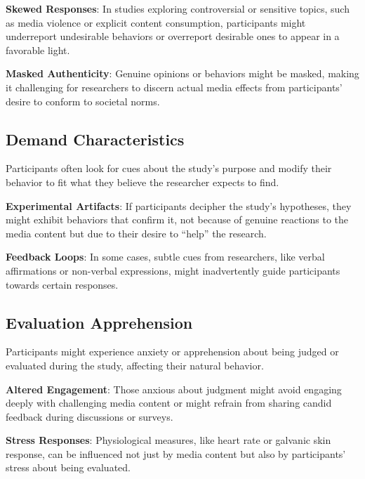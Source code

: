\documentclass[
  b5paper]{book}
\begin{document}
\textbf{Skewed Responses}: In studies exploring controversial or sensitive topics, such as media violence or explicit content consumption, participants might underreport undesirable behaviors or overreport desirable ones to appear in a favorable light.

\textbf{Masked Authenticity}: Genuine opinions or behaviors might be masked, making it challenging for researchers to discern actual media effects from participants' desire to conform to societal norms.

\hypertarget{demand-characteristics}{%
\subsection*{Demand Characteristics}\label{demand-characteristics}}

Participants often look for cues about the study's purpose and modify their behavior to fit what they believe the researcher expects to find.

\textbf{Experimental Artifacts}: If participants decipher the study's hypotheses, they might exhibit behaviors that confirm it, not because of genuine reactions to the media content but due to their desire to ``help'' the research.

\textbf{Feedback Loops}: In some cases, subtle cues from researchers, like verbal affirmations or non-verbal expressions, might inadvertently guide participants towards certain responses.

\hypertarget{evaluation-apprehension}{%
\subsection*{Evaluation Apprehension}\label{evaluation-apprehension}}

Participants might experience anxiety or apprehension about being judged or evaluated during the study, affecting their natural behavior.

\textbf{Altered Engagement}: Those anxious about judgment might avoid engaging deeply with challenging media content or might refrain from sharing candid feedback during discussions or surveys.

\textbf{Stress Responses}: Physiological measures, like heart rate or galvanic skin response, can be influenced not just by media content but also by participants' stress about being evaluated.
\end{document}
